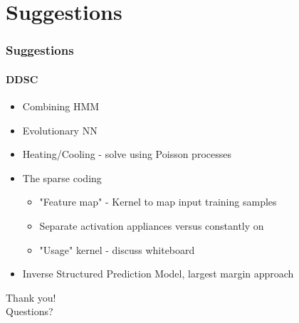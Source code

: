 \documentclass[gray]{beamer}
\begin{document}

\section{Suggestions}
\begin{frame}
\frametitle{Suggestions}
\framesubtitle{DDSC}
\begin{itemize}
\item{Combining HMM}
\item{Evolutionary NN}
\item{Heating/Cooling - solve using Poisson processes}
\item{The sparse coding}
\begin{itemize}
\item{"Feature map" - Kernel to map input training samples}
\item{Separate activation appliances versus constantly on}
\item{"Usage" kernel - discuss whiteboard}
\end{itemize}
\item{Inverse Structured Prediction Model, largest margin approach}
\end{itemize}
\end{frame}

\begin{frame}
\begin{center}
\huge
Thank you!
\normalsize \\
\vspace{0.3in}
Questions?
\end{center}
\end{frame}

\egroup
\end{document}
